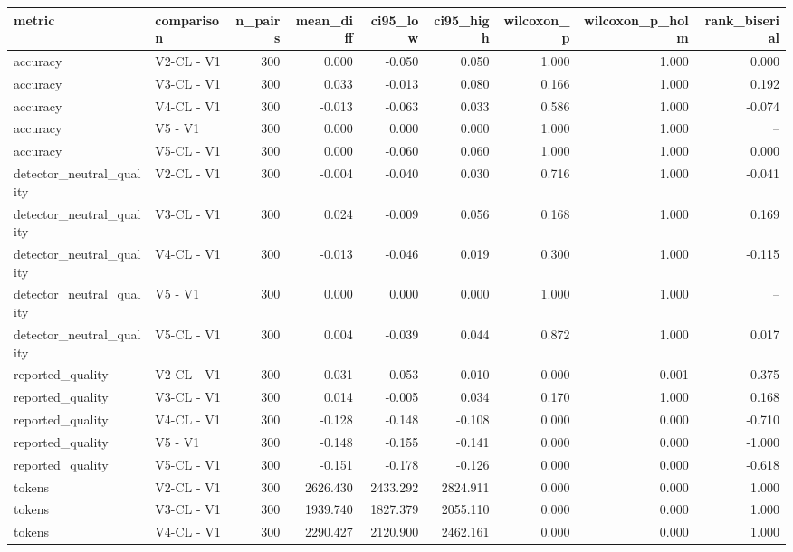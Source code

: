 \begin{table}[t]
\centering
\small
\begin{tabular}{llrrrrrrr}
\toprule
metric & comparison & n\_pairs & mean\_diff & ci95\_low & ci95\_high & wilcoxon\_p & wilcoxon\_p\_holm & rank\_biserial \\
\midrule
accuracy & V2-CL - V1 & 300 & 0.000 & -0.050 & 0.050 & 1.000 & 1.000 & 0.000 \\
accuracy & V3-CL - V1 & 300 & 0.033 & -0.013 & 0.080 & 0.166 & 1.000 & 0.192 \\
accuracy & V4-CL - V1 & 300 & -0.013 & -0.063 & 0.033 & 0.586 & 1.000 & -0.074 \\
accuracy & V5 - V1 & 300 & 0.000 & 0.000 & 0.000 & 1.000 & 1.000 & -- \\
accuracy & V5-CL - V1 & 300 & 0.000 & -0.060 & 0.060 & 1.000 & 1.000 & 0.000 \\
detector\_neutral\_quality & V2-CL - V1 & 300 & -0.004 & -0.040 & 0.030 & 0.716 & 1.000 & -0.041 \\
detector\_neutral\_quality & V3-CL - V1 & 300 & 0.024 & -0.009 & 0.056 & 0.168 & 1.000 & 0.169 \\
detector\_neutral\_quality & V4-CL - V1 & 300 & -0.013 & -0.046 & 0.019 & 0.300 & 1.000 & -0.115 \\
detector\_neutral\_quality & V5 - V1 & 300 & 0.000 & 0.000 & 0.000 & 1.000 & 1.000 & -- \\
detector\_neutral\_quality & V5-CL - V1 & 300 & 0.004 & -0.039 & 0.044 & 0.872 & 1.000 & 0.017 \\
reported\_quality & V2-CL - V1 & 300 & -0.031 & -0.053 & -0.010 & 0.000 & 0.001 & -0.375 \\
reported\_quality & V3-CL - V1 & 300 & 0.014 & -0.005 & 0.034 & 0.170 & 1.000 & 0.168 \\
reported\_quality & V4-CL - V1 & 300 & -0.128 & -0.148 & -0.108 & 0.000 & 0.000 & -0.710 \\
reported\_quality & V5 - V1 & 300 & -0.148 & -0.155 & -0.141 & 0.000 & 0.000 & -1.000 \\
reported\_quality & V5-CL - V1 & 300 & -0.151 & -0.178 & -0.126 & 0.000 & 0.000 & -0.618 \\
tokens & V2-CL - V1 & 300 & 2626.430 & 2433.292 & 2824.911 & 0.000 & 0.000 & 1.000 \\
tokens & V3-CL - V1 & 300 & 1939.740 & 1827.379 & 2055.110 & 0.000 & 0.000 & 1.000 \\
tokens & V4-CL - V1 & 300 & 2290.427 & 2120.900 & 2462.161 & 0.000 & 0.000 & 1.000 \\

\end{tabular}
\end{table}
